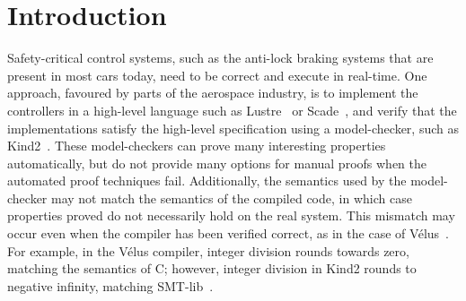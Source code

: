 \documentclass[sigplan,screen, review]{acmart}
\begin{document}



\maketitle

\makeatactive

\section{Introduction}

Safety-critical control systems, such as the anti-lock braking systems that are present in most cars today, need to be correct and execute in real-time.
One approach, favoured by parts of the aerospace industry, is to implement the controllers in a high-level language such as Lustre~\cite{caspi1995functional} or Scade~\cite{colaco2017scade}, and verify that the implementations satisfy the high-level specification using a model-checker, such as Kind2~\cite{champion2016kind2}.
These model-checkers can prove many interesting properties automatically, but do not provide many options for manual proofs when the automated proof techniques fail.
Additionally, the semantics used by the model-checker may not match the semantics of the compiled code, in which case properties proved do not necessarily hold on the real system.
This mismatch may occur even when the compiler has been verified correct, as in the case of Vélus~\cite{bourke2017formally}.
For example, in the Vélus compiler, integer division rounds towards zero, matching the semantics of C; however, integer division in Kind2 rounds to negative infinity, matching SMT-lib~\cite{BarFT2016SMTLIB}.
\end{document}
